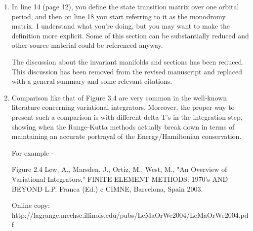 \documentclass[11pt]{article}
\begin{document}
\begin{enumerate}
\item 
    \begin{itshape}
In line 14 (page 12), you define the state transition matrix over one orbital period, and then on line 18 you start referring to it as the monodromy matrix.  I understand what you're doing, but you may want to make the definition more explicit.  Some of this section can be substantially reduced and other source material could be referenced anyway.
\end{itshape}

The discussion about the invariant manifolds and \Poincare sections has been reduced.
This discussion has been removed from the revised manuscript and replaced with a general summary and some relevant citations.

\item 
    \begin{itshape}
Comparison like that of Figure 3.4 are very common in the well-known literature concerning variational integrators.  Moreover, the proper way to present such a comparison is with different delta-T's in the integration step, showing when the Runge-Kutta methods actually break down in terms of maintaining an accurate portrayal of the Energy/Hamiltonian conservation.

For example -

Figure 2.4
Lew, A., Marsden, J., Ortiz, M., West, M., "An Overview of Variational Integrators," FINITE ELEMENT METHODS: 1970's AND BEYOND L.P. Franca (Ed.) c CIMNE, Barcelona, Spain 2003.

Online copy:
http://lagrange.mechse.illinois.edu/pubs/LeMaOrWe2004/LeMaOrWe2004.pdf
\end{itshape}


\end{enumerate}
\end{document}
